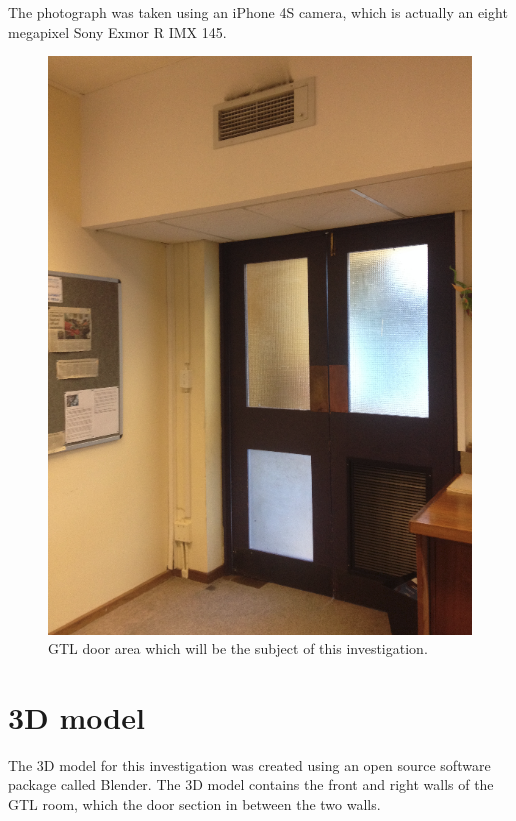 \documentclass[11pt,a4paper]{report}
\begin{document}
		The photograph was taken using an iPhone 4S camera, which is actually an eight megapixel Sony Exmor R IMX 145.
		
		\begin{figure}[H]
			\centering
			\includegraphics[width=1\textwidth]{gtl_door_area}
			\caption[GTL test image]{GTL door area which will be the subject of this investigation.}
		\end{figure}
		
	\section{3D model}
		The 3D model for this investigation was created using an open source software package called Blender. The 3D model contains the front and right walls of the GTL room, which the door section in between the two walls.
		
\end{document}
